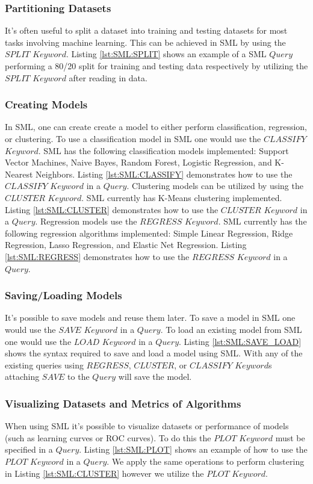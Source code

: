 \subsubsection{Partitioning Datasets}
It's often useful to split a dataset into training and testing datasets for most tasks involving machine learning.  This can be achieved in SML by using the \(SPLIT\) \(Keyword\).  Listing \ref{lst:SML:SPLIT} shows an example of a SML \(Query\) performing a 80/20 split for training and testing data respectively by utilizing the \(SPLIT\) \(Keyword\) after reading in data.

\subsubsection{Creating Models}

In SML,  one can create create a model to either perform classification, regression, or clustering. To use a classification model in SML one would use the \(CLASSIFY\) \(Keyword\). SML has the following classification models implemented: Support Vector Machines, Naive Bayes, Random Forest, Logistic Regression, and K-Nearest Neighbors.  Listing \ref{lst:SML:CLASSIFY} demonstrates how to use the \(CLASSIFY\) \(Keyword\) in a \(Query\).  Clustering models can be utilized by using the \(CLUSTER\) \(Keyword\).  SML currently has K-Means clustering implemented.  Listing \ref{lst:SML:CLUSTER} demonstrates how to use the \(CLUSTER\) \(Keyword\) in a \(Query\).  Regression models use the \(REGRESS\) \(Keyword\).  SML currently has the following regression algorithms implemented: Simple Linear Regression, Ridge Regression, Lasso Regression, and Elastic Net Regression. Listing \ref{lst:SML:REGRESS} demonstrates how to use the \(REGRESS\) \(Keyword\) in a \(Query\).


\subsubsection{Saving/Loading Models}
It's possible to save models and reuse them later. To save a model in SML one would use the \(SAVE\) \(Keyword\) in a \(Query\). To load an existing model from SML one would use the \(LOAD\) \(Keyword\) in a \(Query\).  Listing \ref{lst:SML:SAVE_LOAD} shows the syntax required to save and load a model using SML.  With any of the existing queries using \(REGRESS\),  \(CLUSTER\),  or \(CLASSIFY\) \(Keyword\)s attaching \(SAVE\) to the \(Query\) will save the model. 

\subsubsection{Visualizing Datasets and Metrics of Algorithms}
When using SML it's possible to visualize datasets or performance of models (such as learning curves or ROC curves).  To do this the \(PLOT\) \(Keyword\) must be specified in a \(Query\).  Listing \ref{lst:SML:PLOT} shows an example of how to use the \(PLOT\) \(Keyword\) in a \(Query\).  We apply the same operations to perform clustering in Listing \ref{lst:SML:CLUSTER} however we utilize the \(PLOT\) \(Keyword\).


